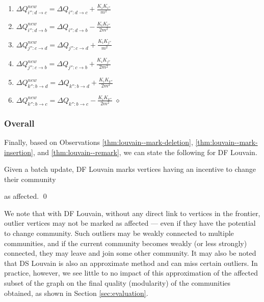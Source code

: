 \begin{enumerate}[start=23]
  \item $\Delta Q_{i'':d \rightarrow c}^{new} = \Delta Q_{i'':d \rightarrow c} + \frac{K_iK_{i''}}{m^2}$
  \item $\Delta Q_{i'':d \rightarrow b}^{new} = \Delta Q_{i'':d \rightarrow b} - \frac{K_iK_{i''}}{2m^2}$
  \item $\Delta Q_{j'':c \rightarrow d}^{new} = \Delta Q_{j'':c \rightarrow d} + \frac{K_iK_{j''}}{m^2}$
  \item $\Delta Q_{j'':c \rightarrow b}^{new} = \Delta Q_{j'':c \rightarrow b} + \frac{K_iK_{j''}}{2m^2}$
  \item $\Delta Q_{k'':b \rightarrow d}^{new} = \Delta Q_{k'':b \rightarrow d} + \frac{K_iK_{k''}}{2m^2}$
  \item $\Delta Q_{k'':b \rightarrow c}^{new} = \Delta Q_{k'':b \rightarrow c} - \frac{K_iK_{k''}}{2m^2}$ \hfill $\diamond$
\end{enumerate}




\subsubsection{Overall}

Finally, based on Observations \ref{thm:louvain--mark-deletion}, \ref{thm:louvain--mark-insertion}, and \ref{thm:louvain--remark}, we can state the following for DF Louvain.

\begin{theorem}
\label{thm:louvain}
Given a batch update, DF Louvain marks vertices having an incentive to change their community as affected. \qed
\end{theorem}

We note that with DF Louvain, without any direct link to vertices in the frontier, outlier vertices may not be marked as affected --- even if they have the potential to change community. Such outliers may be weakly connected to multiple communities, and if the current community becomes weakly (or less strongly) connected, they may leave and join some other community. It may also be noted that DS Louvain is also an approximate method and can miss certain outliers. In practice, however, we see little to no impact of this approximation of the affected subset of the graph on the final quality (modularity) of the communities obtained, as shown in Section \ref{sec:evaluation}.









